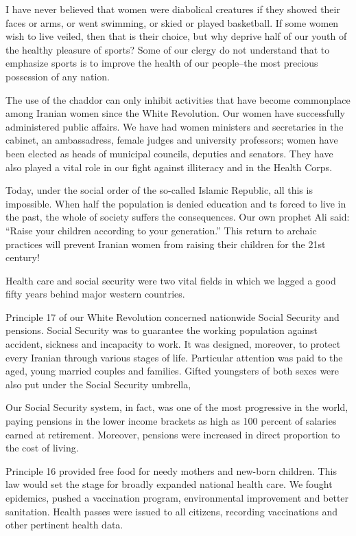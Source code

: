 I have never believed that women were diabolical creatures if they showed their faces or arms, or went swimming, or skied or played basketball. If some women wish to live veiled, then that is their choice, but why deprive half of our youth of the healthy pleasure of sports? Some of our clergy do not understand that to emphasize sports is to improve the health of our people--the most precious possession of any nation. 

The use of the chaddor can only inhibit activities that have become commonplace among Iranian women since the White Revolution. Our women have successfully administered public affairs. We have had women ministers and secretaries in the cabinet, an ambassadress, female judges and university professors; women have been elected as heads of municipal councils, deputies and senators. They have also played a vital role in our fight against illiteracy and in the Health Corps. 

Today, under the social order of the so-called Islamic Republic, all this is impossible. When half the population is denied education and ts forced to live in the past, the whole of society suffers the consequences. Our own prophet Ali said: “Raise your children according to your generation.” This return to archaic practices will prevent Iranian women from raising their children for the 21st century! 


Health care and social security were two vital fields in which we lagged a good fifty years behind major western countries. 

Principle 17 of our White Revolution concerned nationwide Social Security and pensions. Social Security was to guarantee the working population against accident, sickness and incapacity to work. It was designed, moreover, to protect every Iranian through various stages of life. Particular attention was paid to the aged, young married couples and families. Gifted youngsters of both sexes were also put under the Social Security umbrella, 

Our Social Security system, in fact, was one of the most progressive in the world, paying pensions in the lower income brackets as high as 100 percent of salaries earned at retirement. Moreover, pensions were increased in direct proportion to the cost of living. 

Principle 16 provided free food for needy mothers and new-born children. This law would set the stage for broadly expanded national health care. We fought epidemics, pushed a vaccination program, environmental improvement and better sanitation. Health passes were issued to all citizens, recording vaccinations and other pertinent health data. 

